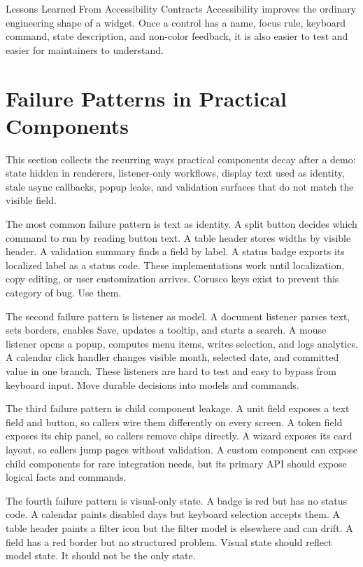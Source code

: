 \begin{principlebox}{Lessons Learned From Accessibility Contracts}
Accessibility improves the ordinary engineering shape of a widget. Once a
control has a name, focus rule, keyboard command, state description, and
non-color feedback, it is also easier to test and easier for maintainers to
understand.
\end{principlebox}

\section{Failure Patterns in Practical Components}

\begin{roadmapbox}
This section collects the recurring ways practical components decay after a
demo: state hidden in renderers, listener-only workflows, display text used as
identity, stale async callbacks, popup leaks, and validation surfaces that do not
match the visible field.
\end{roadmapbox}

The most common failure pattern is text as identity. A split button decides
which command to run by reading button text. A table header stores widths by
visible header. A validation summary finds a field by label. A status badge
exports its localized label as a status code. These implementations work
until localization, copy editing, or user customization arrives. Corusco keys
exist to prevent this category of bug. Use them.

The second failure pattern is listener as model. A document listener parses
text, sets borders, enables Save, updates a tooltip, and starts a search. A
mouse listener opens a popup, computes menu items, writes selection, and logs
analytics. A calendar click handler changes visible month, selected date, and
committed value in one branch. These listeners are hard to test and easy to
bypass from keyboard input. Move durable decisions into models and commands.

The third failure pattern is child component leakage. A unit field exposes a
text field and button, so callers wire them differently on every screen. A
token field exposes its chip panel, so callers remove chips directly. A
wizard exposes its card layout, so callers jump pages without validation. A
custom component can expose child components for rare integration needs, but
its primary API should expose logical facts and commands.

The fourth failure pattern is visual-only state. A badge is red but has no
status code. A calendar paints disabled days but keyboard selection accepts
them. A table header paints a filter icon but the filter model is elsewhere
and can drift. A field has a red border but no structured problem. Visual
state should reflect model state. It should not be the only state.


